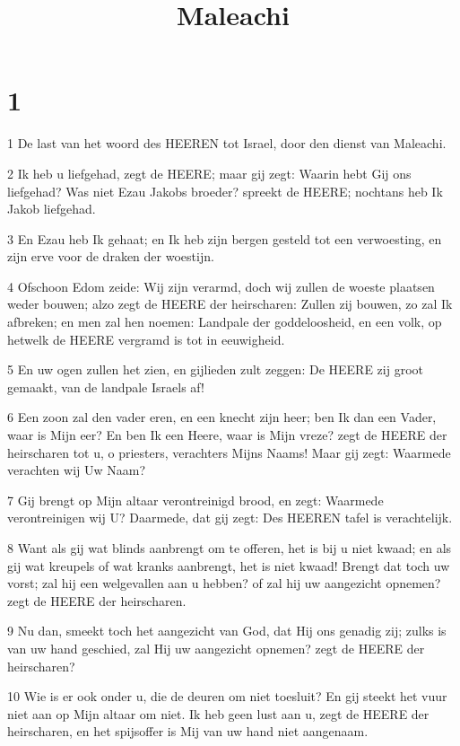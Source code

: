 

\title{Maleachi}



\chapter{1}

\par 1 De last van het woord des HEEREN tot Israel, door den dienst van Maleachi.
\par 2 Ik heb u liefgehad, zegt de HEERE; maar gij zegt: Waarin hebt Gij ons liefgehad? Was niet Ezau Jakobs broeder? spreekt de HEERE; nochtans heb Ik Jakob liefgehad.
\par 3 En Ezau heb Ik gehaat; en Ik heb zijn bergen gesteld tot een verwoesting, en zijn erve voor de draken der woestijn.
\par 4 Ofschoon Edom zeide: Wij zijn verarmd, doch wij zullen de woeste plaatsen weder bouwen; alzo zegt de HEERE der heirscharen: Zullen zij bouwen, zo zal Ik afbreken; en men zal hen noemen: Landpale der goddeloosheid, en een volk, op hetwelk de HEERE vergramd is tot in eeuwigheid.
\par 5 En uw ogen zullen het zien, en gijlieden zult zeggen: De HEERE zij groot gemaakt, van de landpale Israels af!
\par 6 Een zoon zal den vader eren, en een knecht zijn heer; ben Ik dan een Vader, waar is Mijn eer? En ben Ik een Heere, waar is Mijn vreze? zegt de HEERE der heirscharen tot u, o priesters, verachters Mijns Naams! Maar gij zegt: Waarmede verachten wij Uw Naam?
\par 7 Gij brengt op Mijn altaar verontreinigd brood, en zegt: Waarmede verontreinigen wij U? Daarmede, dat gij zegt: Des HEEREN tafel is verachtelijk.
\par 8 Want als gij wat blinds aanbrengt om te offeren, het is bij u niet kwaad; en als gij wat kreupels of wat kranks aanbrengt, het is niet kwaad! Brengt dat toch uw vorst; zal hij een welgevallen aan u hebben? of zal hij uw aangezicht opnemen? zegt de HEERE der heirscharen.
\par 9 Nu dan, smeekt toch het aangezicht van God, dat Hij ons genadig zij; zulks is van uw hand geschied, zal Hij uw aangezicht opnemen? zegt de HEERE der heirscharen?
\par 10 Wie is er ook onder u, die de deuren om niet toesluit? En gij steekt het vuur niet aan op Mijn altaar om niet. Ik heb geen lust aan u, zegt de HEERE der heirscharen, en het spijsoffer is Mij van uw hand niet aangenaam.
